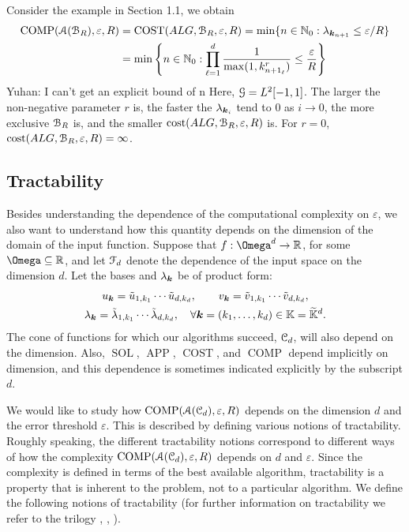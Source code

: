 \documentclass[USenglish]{article}
\theoremstyle{dgthm}
\theoremstyle{dgthm}
\theoremstyle{dgthm}
\theoremstyle{dgthm}
\theoremstyle{dgdef}
\theoremstyle{definition}
\DeclareMathOperator{\SOL}{SOL}
\DeclareMathOperator{\APP}{APP}
\DeclareMathOperator{\COST}{COST}
\DeclareMathOperator{\COMP}{COMP}
\newcommand{\tu}{\Tilde{u}}
\newcommand{\tv}{\Tilde{v}}
\newcommand{\tlambda}{\Tilde{\lambda}}
\newcommand{\tbbK}{\widetilde{\bbK}}
\newcommand{\YuhanNote}[1]{{\color{magenta}Yuhan: #1}}
\begin{document}
Consider the example in Section 1.1, we obtain
	\begin{align*}
	\textup{COMP}({\mathcal{A}}({\mathcal{B}}_{R}),\varepsilon,R) &= \textup{COST}(ALG,{\mathcal{B}}_{R},\varepsilon,R) 
	=\min\{ n \in {\mathbb{N}}_0 : \lambda_{{\boldsymbol{k}}_{n+1}} \leq \varepsilon/R \} \\
	& = \min \left\{ n \in {\mathbb{N}}_0: \prod_{\ell =1}^d \frac{1}{\max(1,k^r_{{ n+1}_\ell})} \leq \frac{\varepsilon}{R} \right\} 
	\end{align*}
	\YuhanNote{I can't get an explicit bound of n}
	Here, ${\mathcal{G}}=L^2[-1,1]$.  The larger the non-negative parameter $r$ is, the faster the $\lambda_{{\boldsymbol{k}}_i}$ tend to 0 as $ i \to 0$, the more exclusive ${\mathcal{B}}_R$ is, and the smaller  $\textup{cost}(ALG,{\mathcal{B}}_{R},\varepsilon,R)$ is.  For $r = 0$, $\textup{cost}(ALG,{\mathcal{B}}_{R},\varepsilon,R) = \infty$.

\subsection{Tractability}\label{DHKM:secTractability}



Besides understanding the dependence of the computational complexity on $\varepsilon$, we also want to understand how this quantity depends on the dimension of the domain of the input function.  Suppose that $f: \Omega^d \to \R$, for some $\Omega \subseteq \R$, and let ${\mathcal{F}}_d$ denote the dependence of the input space on the dimension $d$.  Let the bases and $\lambda_{{\boldsymbol{k}}}$ be of product form:
\begin{gather*}
    u_{\bsk} = \tu_{1,k_1} \cdots \tu_{d,k_d}, \qquad  v_{\bsk} = \tv_{1,k_1} \cdots \tv_{d,k_d}, \\ 
    \lambda_{\bsk} = \tlambda_{1,k_1} \cdots \tlambda_{d,k_d}, \quad \forall \bsk = (k_1, \ldots, k_d) \in \bbK = \tbbK^d.
\end{gather*}
The cone of functions for which our algorithms succeed, ${\mathcal{C}}_d$, will also depend on the dimension.  Also, $\SOL$, $\APP$, $\COST$, and $\COMP$ depend implicitly on dimension, and this dependence is sometimes indicated explicitly by the subscript $d$.

\bigskip

We would like to study how $\COMP(\calA(\calC_d), \varepsilon,R)$ 
depends on the dimension $d$ and the error threshold $\varepsilon$. This is described by defining various notions of tractability. Roughly speaking, the different tractability notions correspond to different 
ways of how the complexity $\COMP(\calA(\calC_d), \varepsilon,R)$ depends on $d$ and $\varepsilon$. Since 
the complexity is defined in terms of the best available algorithm, tractability is a property that is inherent to the problem, not to a particular algorithm. 
We define the following notions of tractability (for further information on tractability we refer to the trilogy 
\cite{NovWoz08a}, \cite{NovWoz10a}, \cite{NovWoz12a}). 
\end{document}
